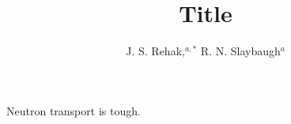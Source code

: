 \documentclass[]{sty/ans/anstrans}
\title{Title}
\author{J. S. Rehak,$^{a,*}$ R. N. Slaybaugh$^a$}
\institute{
$^a$ University of California, Berkeley
}
\begin{document}
Neutron transport is tough.\cite{lewis1993}



\end{document}
